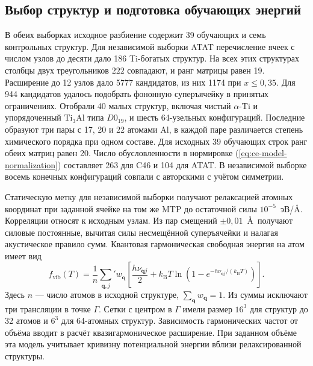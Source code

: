 \subsection{Выбор структур и подготовка обучающих энергий}

В обеих выборках исходное разбиение содержит 39 обучающих и семь контрольных
структур. Для независимой выборки ATAT перечисление ячеек с числом
узлов до десяти дало 186 Ti-богатых структур. На всех этих структурах
столбцы двух треугольников \(222\) совпадают, и ранг матрицы равен 19.
Расширение до 12 узлов дало 5777 кандидатов, из них 1174 при
\(x\leq0{,}35\). Для 944 кандидатов удалось подобрать фононную суперъячейку
в принятых ограничениях. Отобрали 40 малых структур, включая чистый
\(\alpha\)-Ti и упорядоченный \(\mathrm{Ti}_3\mathrm{Al}\) типа
\(D0_{19}\), и шесть 64-узельных конфигураций. Последние образуют три
пары с 17, 20 и 22 атомами Al, в каждой паре различается степень
химического порядка при одном составе. Для исходных 39 обучающих строк
ранг обеих матриц равен 20. Число обусловленности в нормировке
(\ref{eq:ce-model-normalization}) составляет 263 для C46 и 104 для ATAT.
В независимой выборке восемь конечных конфигураций совпали с
авторскими с учётом симметрии.

Статическую метку для независимой выборки получают релаксацией атомных
координат при заданной ячейке на том же MTP до остаточной силы
\(10^{-5}\)~эВ/\AA. Корреляции относят к исходным узлам. Из пар
смещений \(\pm0{,}01\)~\AA\ получают силовые постоянные, вычитая
силы несмещённой суперъячейки и налагая акустическое правило сумм.
Квантовая гармоническая свободная энергия на атом имеет вид
\begin{equation}
 f_{\mathrm{vib}}(T)=\frac{1}{n}
 \sum_{\mathbf q,j}'w_{\mathbf q}
 \left[\frac{h\nu_{\mathbf qj}}{2}
 +k_{\mathrm B}T\ln\!\left(1-e^{-h\nu_{\mathbf qj}/(k_{\mathrm B}T)}\right)
 \right].
 \label{eq:ce-model-phonon}
\end{equation}
Здесь \(n\) --- число атомов в исходной структуре,
\(\sum_{\mathbf q}w_{\mathbf q}=1\). Из суммы исключают три трансляции
в точке \(\Gamma\). Сетки с центром в \(\Gamma\) имели размер
\(16^3\) для структур до 32 атомов и \(6^3\) для 64-атомных структур.
Зависимость гармонических частот от объёма вводит в расчёт
квазигармоническое расширение. При заданном объёме эта модель учитывает
кривизну потенциальной энергии вблизи релаксированной структуры.

